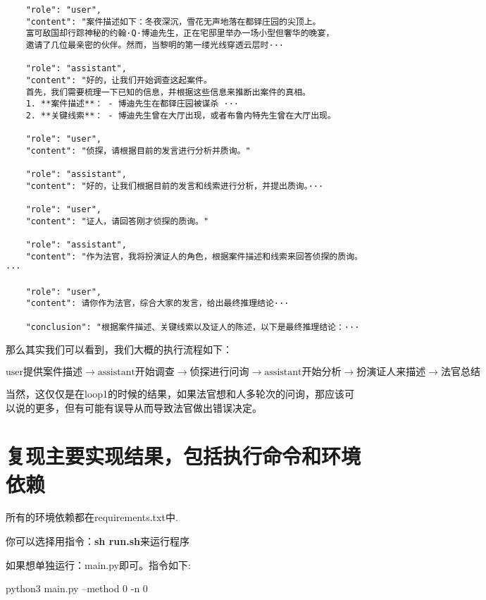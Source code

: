 \documentclass[answers]{exam}  %
\begin{document}
\begin{lstlisting}
    "role": "user",
    "content": "案件描述如下：冬夜深沉，雪花无声地落在都铎庄园的尖顶上。
    富可敌国却行踪神秘的约翰·Q·博迪先生，正在宅邸里举办一场小型但奢华的晚宴，
    邀请了几位最亲密的伙伴。然而，当黎明的第一缕光线穿透云层时···

    "role": "assistant",
    "content": "好的，让我们开始调查这起案件。
    首先，我们需要梳理一下已知的信息，并根据这些信息来推断出案件的真相。
    1. **案件描述**： - 博迪先生在都铎庄园被谋杀 ···
    2. **关键线索**： - 博迪先生曾在大厅出现，或者布鲁内特先生曾在大厅出现。

    "role": "user",
    "content": "侦探，请根据目前的发言进行分析并质询。"

    "role": "assistant",
    "content": "好的，让我们根据目前的发言和线索进行分析，并提出质询。···

    "role": "user",
    "content": "证人，请回答刚才侦探的质询。"

    "role": "assistant",
    "content": "作为法官，我将扮演证人的角色，根据案件描述和线索来回答侦探的质询。···

    "role": "user",
    "content": 请你作为法官，综合大家的发言，给出最终推理结论···

    "conclusion": "根据案件描述、关键线索以及证人的陈述，以下是最终推理结论：···
\end{lstlisting}

那么其实我们可以看到，我们大概的执行流程如下：

\begin{equation*}
    \text{user提供案件描述}\rightarrow\text{assistant开始调查}\rightarrow\text{侦探进行问询}\rightarrow\text{assistant开始分析}\rightarrow\text{扮演证人来描述}\rightarrow\text{法官总结}
\end{equation*}

当然，这仅仅是在loop1的时候的结果，如果法官想和人多轮次的问询，那应该可以说的更多，但有可能有误导从而导致法官做出错误决定。

\section{复现主要实现结果，包括执行命令和环境依赖}

所有的环境依赖都在requirements.txt中.

你可以选择用指令：\textbf{sh run.sh}来运行程序

如果想单独运行：main.py即可。指令如下:

python3 main.py --method 0 -n 0
\end{document}

